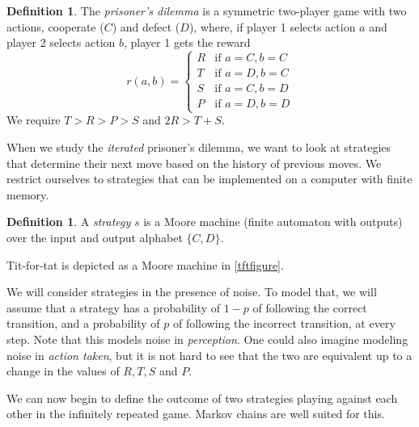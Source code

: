 \documentclass[12pt]{article}
\theoremstyle{definition}
\newtheorem{definition}[theorem]{Definition}
\theoremstyle{remark}
\begin{document}


\begin{definition}
  The \textit{prisoner's dilemma} is a symmetric two-player game with two actions, cooperate ($C$) and defect ($D$), where, if player 1 selects action $a$ and player 2 selects action $b$, player 1 gets the reward
  \begin{equation*}
    r(a,b) = \begin{cases}
      R &\text{if $a = C, b = C$} \\
      T &\text{if $a = D, b = C$} \\
      S &\text{if $a = C, b = D$} \\
      P &\text{if $a = D, b = D$}
    \end{cases}
  \end{equation*}
  We require $T > R > P > S$ and $2R > T + S$.
\end{definition}

When we study the \textit{iterated} prisoner's dilemma, we want to look at strategies that determine their next move based on the history of previous moves. We restrict ourselves to strategies that can be implemented on a computer with finite memory.

\begin{definition}
  A \textit{strategy} $s$ is a Moore machine (finite automaton with outputs) over the input and output alphabet $\{C, D\}$. 
\end{definition}

Tit-for-tat is depicted as a Moore machine in \cref{tftfigure}.

We will consider strategies in the presence of noise. To model that, we will assume that a strategy has a probability of $1-p$ of following the correct transition, and a probability of $p$ of following the incorrect transition, at every step. Note that this models noise in \textit{perception}. One could also imagine modeling noise in \textit{action taken}, but it is not hard to see that the two are equivalent up to a change in the values of $R, T, S$ and $P$.

We can now begin to define the outcome of two strategies playing against each other in the infinitely repeated game. Markov chains are well suited for this.
\end{document}
